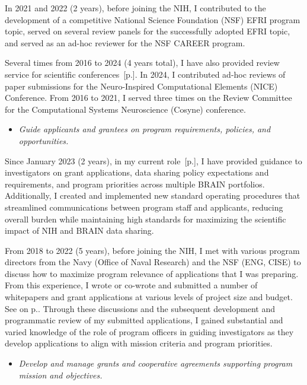 \documentclass[10pt]{article}
\newcommand{\see}[1]{[\textcolor{hopkinsblue}{p.\pageref{sec:#1}}]}
\newcommand{\cf}[1]{\textcolor{hopkinsblue}{See \emph{\nameref{sec:#1}} on p.\pageref{sec:#1}}}
\begin{document}
In 2021 and 2022 (2 years), before joining the NIH, I contributed to the
development of a competitive National Science Foundation (NSF) EFRI program
topic, served on several review panels for the successfully adopted EFRI topic,
and served as an ad-hoc reviewer for the NSF CAREER program.

Several times from 2016 to 2024 (4 years total), I have also provided review
service for scientific conferences~\see{service}. In 2024, I contributed ad-hoc
reviews of paper submissions for the Neuro-Inspired Computational Elements
(NICE) Conference. From 2016 to 2021, I served three times on the Review
Committee for the Computational Systems Neuroscience (Cosyne) conference.

\begin{itemize}
  \color{hopkinsblue}
  \item \emph{Guide applicants and grantees on program requirements, policies,
and opportunities.}
\end{itemize}

Since January 2023 (2 years), in my current role~\see{jobobd}, I have
provided guidance to investigators on grant applications, data sharing policy
expectations and requirements, and program priorities across multiple BRAIN
portfolios. Additionally, I created and implemented new standard operating
procedures that streamlined communications between program staff and applicants,
reducing overall burden while maintaining high standards for maximizing the
scientific impact of NIH and BRAIN data sharing.

From 2018 to 2022 (5 years), before joining the NIH, I met with various
program directors from the Navy (Office of Naval Research) and the NSF (ENG,
CISE) to discuss how to maximize program relevance of applications that I was
preparing. From this experience, I wrote or co-wrote and submitted a number of
whitepapers and grant applications at various levels of project size and budget.
\cf{resprogram}. Through these discussions and the subsequent development and
programmatic review of my submitted applications, I gained substantial and
varied knowledge of the role of program officers in guiding investigators as
they develop applications to align with mission criteria and program priorities.


\begin{itemize}
  \color{hopkinsblue}
  \item \emph{Develop and manage grants and cooperative agreements supporting
program mission and objectives.}
\end{itemize}
\end{document}
